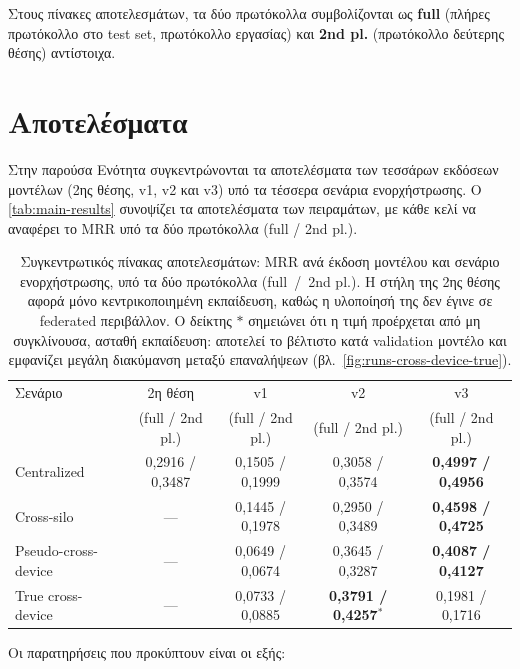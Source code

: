 Στους πίνακες αποτελεσμάτων, τα δύο πρωτόκολλα συμβολίζονται ως \textbf{full} (πλήρες πρωτόκολλο στο test set, πρωτόκολλο εργασίας) και \textbf{2nd pl.} (πρωτόκολλο δεύτερης θέσης) αντίστοιχα.

\section{Αποτελέσματα}\label{sec:exp-results}
Στην παρούσα Ενότητα συγκεντρώνονται τα αποτελέσματα των τεσσάρων εκδόσεων μοντέλων (2ης θέσης, v1, v2 και v3) υπό τα τέσσερα σενάρια ενορχήστρωσης. Ο \autoref{tab:main-results} συνοψίζει τα αποτελέσματα των πειραμάτων, με κάθε κελί να αναφέρει το MRR υπό τα δύο πρωτόκολλα (full / 2nd pl.).

\begin{table}[htbp]
  \centering
  \begin{tabular}{@{}l cccc@{}}
    \toprule
    Σενάριο & 2η θέση & v1 & v2 & v3 \\
     & (full / 2nd pl.) & (full / 2nd pl.) & (full / 2nd pl.) & (full / 2nd pl.) \\
    \midrule
    Centralized           & 0,2916 / 0,3487 & 0,1505 / 0,1999 & 0,3058 / 0,3574 & \textbf{0,4997 / 0,4956} \\
    Cross-silo            & ---             & 0,1445 / 0,1978 & 0,2950 / 0,3489 & \textbf{0,4598 / 0,4725} \\
    Pseudo-cross-device   & ---             & 0,0649 / 0,0674 & 0,3645 / 0,3287 & \textbf{0,4087 / 0,4127} \\
    True cross-device     & ---             & 0,0733 / 0,0885 & \textbf{0,3791 / 0,4257}$^{\ast}$ & 0,1981 / 0,1716 \\
    \bottomrule
  \end{tabular}
  \caption[Συγκεντρωτικός πίνακας αποτελεσμάτων]{Συγκεντρωτικός πίνακας αποτελεσμάτων: MRR ανά έκδοση μοντέλου και σενάριο ενορχήστρωσης, υπό τα δύο πρωτόκολλα (full~/~2nd pl.). Η στήλη της 2ης θέσης αφορά μόνο κεντρικοποιημένη εκπαίδευση, καθώς η υλοποίησή της δεν έγινε σε federated περιβάλλον. Ο δείκτης $\ast$ σημειώνει ότι η τιμή προέρχεται από μη συγκλίνουσα, ασταθή εκπαίδευση: αποτελεί το βέλτιστο κατά validation μοντέλο και εμφανίζει μεγάλη διακύμανση μεταξύ επαναλήψεων (βλ.\ \autoref{fig:runs-cross-device-true}).}
  \label{tab:main-results}
\end{table}

Οι παρατηρήσεις που προκύπτουν είναι οι εξής:

